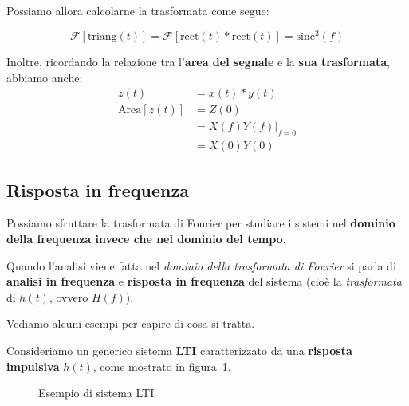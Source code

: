 Possiamo allora calcolarne la trasformata come segue:

\begin{exa}
    \[
        \mathcal{F}[\text{triang}(t)] = \mathcal{F}[\text{rect}(t) \ast \text{rect}(t)]
        = \text{sinc}^2(f)
    \] 
\end{exa}

Inoltre, ricordando la relazione tra l'\textbf{area del segnale} e la \textbf{sua trasformata}, 
abbiamo anche:
\[
    \begin{aligned}
        z(t) &= x(t) \ast y(t) \\ 
        \text{Area}[z(t)] &= Z(0) \\ 
                      &= X(f) Y(f) \bigg|_{f=0} \\ 
                      &= X(0) Y(0)
    \end{aligned}
\]

\subsection{Risposta in frequenza}

Possiamo sfruttare la trasformata di Fourier per studiare i sistemi nel 
\textbf{dominio della frequenza invece che nel dominio del tempo}.

\begin{remark}
    Quando l'analisi viene fatta nel \textit{dominio della trasformata di Fourier}
    si parla di \textbf{analisi in frequenza} e \textbf{risposta in frequenza}
    del sistema (cioè la \textit{trasformata} di $h(t)$, ovvero $H(f)$).
\end{remark}

Vediamo alcuni esempi per capire di cosa si tratta.

Consideriamo un generico sistema \textbf{LTI} caratterizzato da una 
\textbf{risposta impulsiva} $h(t)$, come mostrato in figura~\ref{fig:04_03_EsSistemaLTI}.

\begin{figure}[!ht]
    \centering
    \caption{Esempio di sistema LTI}
    \label{fig:04_03_EsSistemaLTI}
\end{figure}

